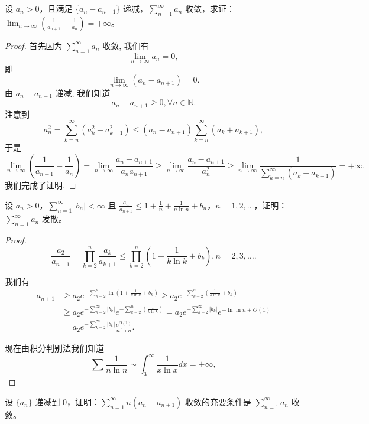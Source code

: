 \documentclass[lang=cn,10pt,thmcnt=section]{elegantbook}
\begin{document}
	\begin{example}
	设 $a_n > 0$，且满足 $\{a_n - a_{n+1}\}$ 递减，$\sum_{n=1}^{\infty} a_n$ 收敛，求证：$\lim_{n \to \infty} \left( \frac{1}{a_{n+1}} - \frac{1}{a_n} \right) = +\infty$。
	\end{example}
	\begin{proof}
		首先因为 $\displaystyle\sum_{n=1}^\infty a_n$ 收敛, 我们有
\[
\lim_{n\to\infty} a_n = 0,
\]
即
\[
\lim_{n\to\infty} (a_n - a_{n+1}) = 0.
\]
由 $a_n - a_{n+1}$ 递减, 我们知道
\[
a_n - a_{n+1} \ge 0, \forall n \in \mathbb{N}.
\]
注意到
\[
a_n^2 = \sum_{k=n}^\infty (a_k^2 - a_{k+1}^2) \le (a_n - a_{n+1}) \sum_{k=n}^\infty (a_k + a_{k+1}),
\]
于是
\[
\lim_{n\to\infty} \left(\frac{1}{a_{n+1}} - \frac{1}{a_n}\right) = \lim_{n\to\infty} \frac{a_n - a_{n+1}}{a_n a_{n+1}} \ge \lim_{n\to\infty} \frac{a_n - a_{n+1}}{a_n^2} \ge \lim_{n\to\infty} \frac{1}{\sum_{k=n}^\infty (a_k + a_{k+1})} = +\infty.
\]
我们完成了证明.
	\end{proof}
	\begin{example}
	设 $a_n > 0$，$\sum_{n=1}^{\infty} |b_n| < \infty$ 且 $\frac{a_n}{a_{n+1}} \leq 1 + \frac{1}{n} + \frac{1}{n \ln n} + b_n$，$n = 1, 2, \ldots$，证明：$\sum_{n=1}^{\infty} a_n$ 发散。
	\end{example}
	\begin{proof}
		\[
\frac{a_2}{a_{n+1}} = \prod_{k=2}^n \frac{a_k}{a_{k+1}} \le \prod_{k=2}^n \left(1 + \frac{1}{k \ln k} + b_k \right), n=2,3,\dots.
\]

\noindent
我们有
\begin{align*}
    a_{n+1} &\ge a_2 e^{-\sum_{k=2}^n \ln(1+\frac{1}{k\ln k}+b_k)} \ge a_2 e^{-\sum_{k=2}^n (\frac{1}{k\ln k}+b_k)} \\
    &\ge a_2 e^{-\sum_{k=2}^\infty |b_k|} e^{-\sum_{k=2}^n (\frac{1}{k\ln k})} = a_2 e^{-\sum_{k=2}^\infty |b_k|} e^{-\ln\ln n+O(1)} \\
    &= a_2 e^{-\sum_{k=2}^\infty |b_k|} \frac{e^{O(1)}}{n \ln n}.
\end{align*}

\noindent
现在由积分判别法我们知道
\[
\sum \frac{1}{n \ln n} \sim \int_3^\infty \frac{1}{x \ln x} dx = +\infty,
\]
	\end{proof}
	\begin{example}
	设 $\{a_n\}$ 递减到 0，证明：$\sum_{n=1}^{\infty} n(a_n - a_{n+1})$ 收敛的充要条件是 $\sum_{n=1}^{\infty} a_n$ 收敛。
	\end{example}
\end{document}
